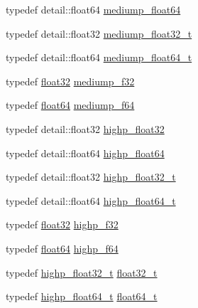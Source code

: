 \begin{CompactItemize}
\item 
typedef detail::float64 \hyperlink{group__gtc__type__precision_g9225ae6aed0f90b6eb65bf8d466199c1}{mediump\_\-float64}
\item 
typedef detail::float32 \hyperlink{group__gtc__type__precision_gcbd406715148db96c9d9d2a2ef6460de}{mediump\_\-float32\_\-t}
\item 
typedef detail::float64 \hyperlink{group__gtc__type__precision_g97a0747b103eb5ef320a91888de52f51}{mediump\_\-float64\_\-t}
\item 
typedef \hyperlink{group__gtc__type__precision_g814f2f65354b6588b067cc5c67a6b340}{float32} \hyperlink{group__gtc__type__precision_g3dbba6bd06a546d7a11d1c09c2f04b1a}{mediump\_\-f32}
\item 
typedef \hyperlink{group__gtc__type__precision_gb721f828b41f46b20cf4883b50733d3b}{float64} \hyperlink{group__gtc__type__precision_gbd273bd38ea5e013aeec9ffd2b2591fb}{mediump\_\-f64}
\item 
typedef detail::float32 \hyperlink{group__gtc__type__precision_g91af7513c1102410646f2c435ca29be5}{highp\_\-float32}
\item 
typedef detail::float64 \hyperlink{group__gtc__type__precision_gb871a78c548d2fa53e1e8ec64a46eee7}{highp\_\-float64}
\item 
typedef detail::float32 \hyperlink{group__gtc__type__precision_g4e16a7818d09e2da3b81765999f23928}{highp\_\-float32\_\-t}
\item 
typedef detail::float64 \hyperlink{group__gtc__type__precision_ge8b3b2ace5be2a61c6bf63f12643fa15}{highp\_\-float64\_\-t}
\item 
typedef \hyperlink{group__gtc__type__precision_g814f2f65354b6588b067cc5c67a6b340}{float32} \hyperlink{group__gtc__type__precision_g48d80b6fd3a40b71b2e414493832d1ca}{highp\_\-f32}
\item 
typedef \hyperlink{group__gtc__type__precision_gb721f828b41f46b20cf4883b50733d3b}{float64} \hyperlink{group__gtc__type__precision_gb1306a5a8ae99fb2867b548b1546bbe0}{highp\_\-f64}
\item 
typedef \hyperlink{group__gtc__type__precision_g4e16a7818d09e2da3b81765999f23928}{highp\_\-float32\_\-t} \hyperlink{group__gtc__type__precision_g642737ae3e7c434b366f2191e6944bf2}{float32\_\-t}
\item 
typedef \hyperlink{group__gtc__type__precision_ge8b3b2ace5be2a61c6bf63f12643fa15}{highp\_\-float64\_\-t} \hyperlink{group__gtc__type__precision_gde966a3eb25ebeb16dd53c40d3fdeb46}{float64\_\-t}
\item 

\end{CompactItemize}
